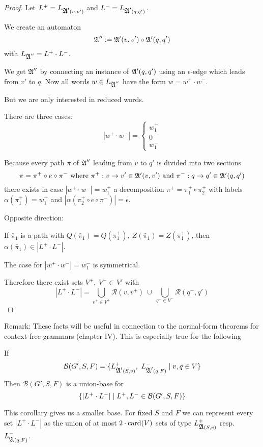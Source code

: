 \begin{proof}
Let $L^+ = L_{\mbox{$\mathfrak{A'}$}(v, v')}$ and $L^- = L_{\mbox{$\mathfrak{A'}$}(q, q')}$. 

We create an automaton
\[ \mbox{$\mathfrak{A}$}'' := \mbox{$\mathfrak{A'}$}(v, v') \circ \mbox{$\mathfrak{A'}$}(q, q') \]
with $L_{\mbox{$\mathfrak{A}$}''} = L^+ \cdot L^-$.

We get $\mbox{$\mathfrak{A}$}''$ by connecting an instance of $\mbox{$\mathfrak{A'}$}(q, q')$ using an
$\epsilon$-edge which leads from $v'$ to $q$. Now all words $w \in L_{\mbox{$\mathfrak{A}$}''}$
have the form $w = w^+ \cdot w^-$. 

But we are only interested in reduced words.

There are three cases:
\[ |w^+ \cdot w^-| = \begin{cases} w_1^+ \\ 0 \\ w_1^- \end{cases} \]

Because every path $\pi$ of $\mbox{$\mathfrak{A}$}''$ leading from $v$ to $q'$ is divided into
two sections
\[ \pi = \pi^+ \circ e \circ \pi^- \text{ where }\pi^+: v \to v' \in \mbox{$\mathfrak{A'}$}(v,
v')\text{ and }\pi^-: q \to q' \in \mbox{$\mathfrak{A'}$}(q, q') \]
there exists in case $|w^+ \cdot w^-| = w_1^+$ a decomposition $\pi^+ = \pi_1^+
\circ \pi_2^+$ with labels $\alpha(\pi_1^+) = w_1^+$ and $|\alpha(\pi_2^+ \circ
e \circ \pi^-)| = \epsilon$.

\bigskip
Opposite direction:

If $\bar{\pi}_1$ is a path with $Q(\bar{\pi}_1) = Q(\pi_1^+),\ Z(\bar{\pi}_1) =
Z(\pi_1^+)$, then $\alpha(\bar{\pi}_1) \in |L^+ \cdot L^-|$.

\medskip
The case for $|w^+ \cdot w^-| = w_1^-$ is symmetrical.

\bigskip
Therefore there exist sets $V^+,\ V^- \subset V'$ with
\[ |L^+ \cdot L^-| = \bigcup_{v^+ \in V^+} \mathcal{R}(v, v^+) \ \cup\ 
\bigcup_{q^- \in V^-} \mathcal{R}(q^-, q') \]
\end{proof}

Remark: These facts will be useful in connection to the normal-form
theorems for context-free grammars (chapter IV). This is especially true for the
following

\begin{corollary}
If 
\[ \mathcal{B}(G', S, F) = \mbox{$\{L^+_{\mbox{$\mathfrak{A'}$}(S, v)},\ L^-_{\mbox{$\mathfrak{A'}$}(q, F)}
\mid v, q \in V\}$} \]
Then $\mathcal{B}(G', S, F)$ is a union-base for
\[ \mbox{$\{|L^+ \cdot L^-| \mid L^+, L^- \in \mathcal{B}(G', S, F)\}$} \]
\end{corollary}

This corollary gives us a smaller base. For fixed $S$ and $F$ we can represent
every set $|L^+ \cdot L^-|$ as the union of at most $2 \cdot \mathrm{card}({V})$ sets of
type $L^+_{\mbox{$\mathfrak{A}$}(S, v)}$ resp.\ $L^-_{\mbox{$\mathfrak{A}$}(q, F)}$.

